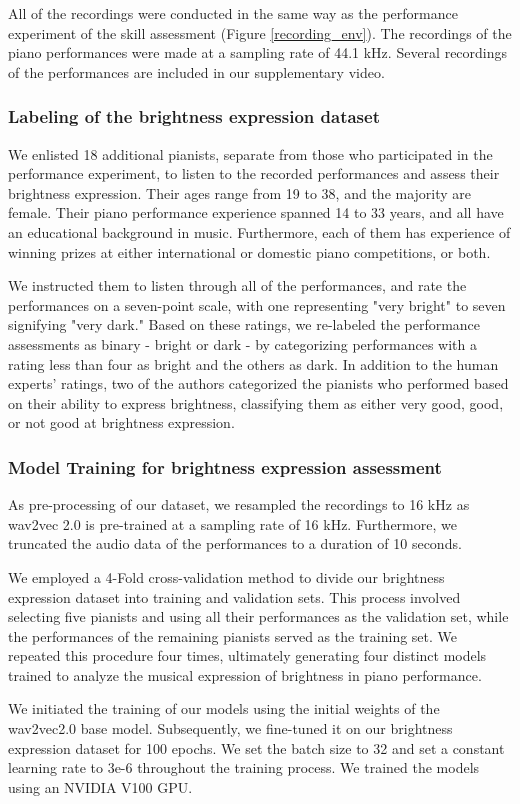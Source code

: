 All of the recordings were conducted in the same way as the performance experiment of the skill assessment (Figure \ref{recording_env}).
The recordings of the piano performances were made at a sampling rate of 44.1 kHz. 
Several recordings of the performances are included in our supplementary video.


\subsubsection*{Labeling of the brightness expression dataset}
We enlisted 18 additional pianists, separate from those who participated in the performance experiment, to listen to the recorded performances and assess their brightness expression. 
Their ages range from 19 to 38, and the majority are female.  %
Their piano performance experience spanned 14 to 33 years, and all have an educational background in music. Furthermore, each of them has experience of winning prizes at either international or domestic piano competitions, or both.

We instructed them to listen through all of the performances, and rate the performances on a seven-point scale, with one representing "very bright" to seven signifying "very dark." 
Based on these ratings, we re-labeled the performance assessments as binary - bright or dark - by categorizing performances with a rating less than four as bright and the others as dark. 
In addition to the human experts' ratings, two of the authors categorized the pianists who performed based on their ability to express brightness, classifying them as either very good, good, or not good at brightness expression.


\subsubsection*{Model Training for brightness expression assessment}
As pre-processing of our dataset, we resampled the recordings to 16 kHz as wav2vec 2.0 is pre-trained at a sampling rate of 16 kHz.
Furthermore, we truncated the audio data of the performances to a duration of 10 seconds.

We employed a 4-Fold cross-validation method to divide our brightness expression dataset into training and validation sets. 
This process involved selecting five pianists and using all their performances as the validation set, while the performances of the remaining pianists served as the training set. 
We repeated this procedure four times, ultimately generating four distinct models trained to analyze the musical expression of brightness in piano performance.

We initiated the training of our models using the initial weights of the wav2vec2.0 base model. 
Subsequently, we fine-tuned it on our brightness expression dataset for 100 epochs. 
We set the batch size to 32 and set a constant learning rate to 3e-6 throughout the training process. 
We trained the models using an NVIDIA V100 GPU.